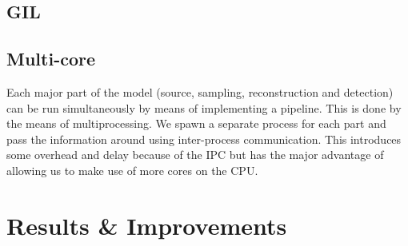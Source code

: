 \documentclass[a4paper, openany, oneside]{memoir}
\begin{document}
\subsection{GIL}
\label{sec:gil}

\subsection{Multi-core}
\label{sec:multi-core}
Each major part of the model (source, sampling, reconstruction and detection) can be run simultaneously by means of implementing a pipeline. This is done by the means of multiprocessing. We spawn a separate process for each part and pass the information around using inter-process communication. This introduces some overhead and delay because of the IPC but has the major advantage of allowing us to make use of more cores on the CPU.

\section{Results \& Improvements}
\label{sec:results}
\end{document}
